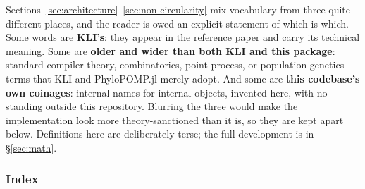 \documentclass[11pt,leqno]{article}
\newcommand{\pkg}[1]{\textsf{#1}}
\theoremstyle{plain}
\theoremstyle{definition}
\begin{document}
Sections~\ref{sec:architecture}--\ref{sec:non-circularity} mix vocabulary from
three quite different places, and the reader is owed an explicit statement of
which is which.  Some words are \textbf{KLI's}: they appear in the reference
paper and carry its technical meaning.  Some are \textbf{older and wider than
both KLI and this package}: standard compiler-theory, combinatorics,
point-process, or population-genetics terms that KLI and \pkg{PhyloPOMP.jl}
merely adopt.  And some are \textbf{this codebase's own coinages}: internal
names for internal objects, invented here, with no standing outside this
repository.  Blurring the three would make the implementation look more
theory-sanctioned than it is, so they are kept apart below.  Definitions here
are deliberately terse; the full development is in
\S\ref{sec:math}.

\subsubsection{Index}
\end{document}
